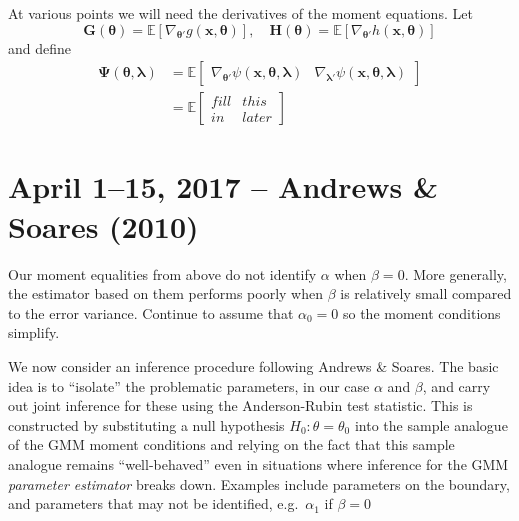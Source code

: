 \documentclass[12pt]{article}
\begin{document}
At various points we will need the derivatives of the moment equations.
Let
\[
  \mathbf{G}(\boldsymbol{\theta}) = \mathbb{E}[\nabla_{\boldsymbol{\theta}'} g(\mathbf{x},\boldsymbol{\theta})], \quad \mathbf{H}(\boldsymbol{\theta}) = \mathbb{E}[\nabla_{\boldsymbol{\theta}'} h(\mathbf{x},\boldsymbol{\theta})]
\]
and define 
\begin{align*}
  \boldsymbol{\Psi}(\boldsymbol{\theta}, \boldsymbol{\lambda}) &= \mathbb{E}
  \left[
  \begin{array}{cc}
    \nabla_{\boldsymbol{\theta}'} \psi(\mathbf{x}, \boldsymbol{\theta}, \boldsymbol{\lambda}) &
    \nabla_{\boldsymbol{\lambda}'} \psi(\mathbf{x}, \boldsymbol{\theta}, \boldsymbol{\lambda}) 
  \end{array}
\right]\\
&= \mathbb{E}\left[
\begin{array}{cc}
 fill & this \\
 in & later
\end{array}
\right]
\end{align*}

\section{April 1--15, 2017 -- Andrews \& Soares (2010)}
Our moment equalities from above do not identify $\alpha$ when $\beta=0$.
More generally, the estimator based on them performs poorly when $\beta$ is relatively small compared to the error variance.
Continue to assume that $\alpha_0 = 0$ so the moment conditions simplify.

We now consider an inference procedure following Andrews \& Soares.
The basic idea is to ``isolate'' the problematic parameters, in our case $\alpha$ and $\beta$, and carry out joint inference for these using the Anderson-Rubin test statistic.
This is constructed by substituting a null hypothesis $H_0\colon \theta = \theta_0$ into the sample analogue of the GMM moment conditions and relying on the fact that this sample analogue remains ``well-behaved'' even in situations where inference for the GMM \emph{parameter estimator} breaks down.
Examples include parameters on the boundary, and parameters that may not be identified, e.g.\ $\alpha_1$ if $\beta = 0$
\end{document}
